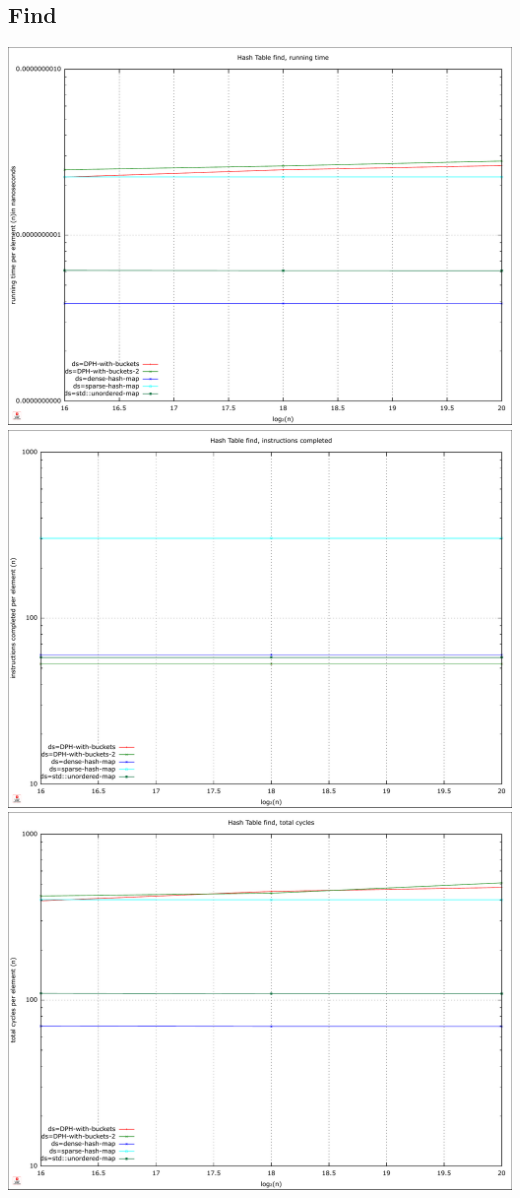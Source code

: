 \documentclass{article}
\begin{document}
\subsection*{Find}
\centering
\includegraphics[width=\linewidth]{img/hash_find_time}
\includegraphics[width=\linewidth]{img/hash_find_instructions}
\includegraphics[width=\linewidth]{img/hash_find_cycles}
\end{document}
